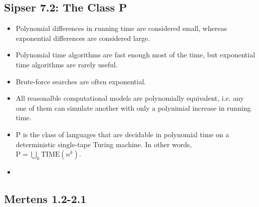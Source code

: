 \documentclass{article}
\begin{document}
\subsection{Sipser 7.2: The Class P}
\begin{itemize}
    \item Polynomial differences in running time are considered small, whereas exponential differences are considered large.
    \item Polynomial time algorithms are fast enough most of the time, but exponential time algorithms are rarely useful.
    \item Brute-force searches are often exponential.
    \item All reasonalble computational models are polynomially equivalent, i.e. any one of them can simulate another with only a polynimial increase in running time.
    \item $\textrm{P}$ is the class of languages that are decidable in polynomial time on a deterministic single-tape Turing machine. In other words, $\textrm{P}=\bigcup_k \textrm{TIME}(n^k)$.
    \item 
\end{itemize}
\subsection{Mertens 1.2-2.1}
\end{document}
